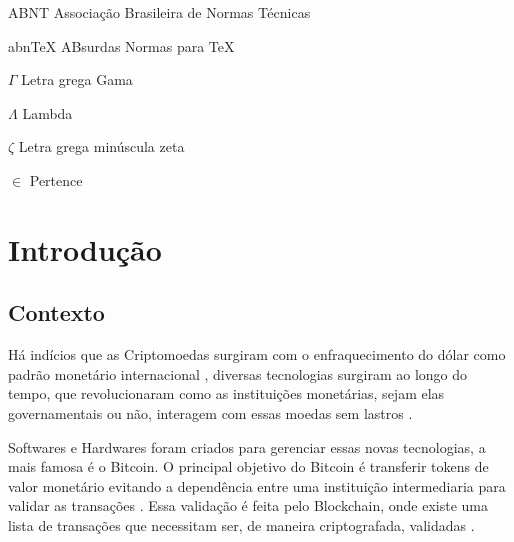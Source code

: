 \documentclass[
article,			%
12pt,				%
openright,			%
oneside,			%
a4paper,			%
chapter=TITLE,		%
section=TITLE,		%
subsection=TITLE,	%
subsubsection=TITLE,%
subsubsubsection=TITLE, %
english,			%
brazil,				%
]{abntex2}
\begin{document}

\listoffigures*
\cleardoublepage

\listoftables*
\cleardoublepage

\begin{siglas}
\item[ABNT] Associação Brasileira de Normas Técnicas
\item[abnTeX] ABsurdas Normas para TeX
\end{siglas}

\begin{simbolos}
\item[$ \Gamma $] Letra grega Gama
\item[$ \Lambda $] Lambda
\item[$ \zeta $] Letra grega minúscula zeta
\item[$ \in $] Pertence
\end{simbolos}

\tableofcontents*
\cleardoublepage


\textual

\section{Introdução}

\subsection{Contexto}

Há indícios que as Criptomoedas surgiram com o enfraquecimento do
dólar como padrão monetário internacional \cite{FAE2014}, diversas
tecnologias surgiram ao longo do tempo, que revolucionaram como as
instituições monetárias, sejam elas governamentais ou não, interagem
com essas moedas sem lastros \cite{Said2017}.

Softwares e Hardwares foram criados para gerenciar essas novas
tecnologias, a mais famosa é o Bitcoin. O principal objetivo do
Bitcoin é transferir tokens de valor monetário evitando a dependência
entre uma instituição intermediaria para validar as transações
\cite{Nakamoto2008}. Essa validação é feita pelo Blockchain, onde
existe uma lista de transações que necessitam ser, de maneira
criptografada, validadas \cite{Economist2015}.
\end{document}
